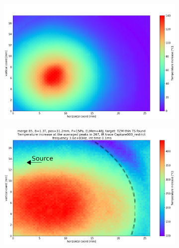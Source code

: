 \begin{figure}[!ht]
     \centering
     \begin{subfigure}{0.6\linewidth}
         \centering
         \includegraphics[width=\textwidth,trim={50 40 10 60},clip]{Chapters/chapter3/figs/file_index_393_IR_trace_Capture048_32b.png}
        \vspace*{-5mm}
        {\color{white}\caption{\phantom{wewew}}\label{fig:IR8a}}
     \end{subfigure}
     \hfill
     \begin{subfigure}{0.6\linewidth}
         \centering
         \includegraphics[width=\textwidth,trim={50 40 10 66},clip]{Chapters/chapter3/figs/file_index_267_IR_trace_Capture003_restrict_32b (copy).png}

\end{subfigure}
\end{figure}
